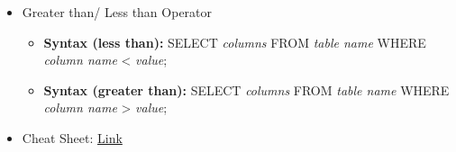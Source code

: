 \documentclass[12pt]{article}
\begin{document}
\begin{itemize}
    \item Greater than/ Less than Operator
    \begin{itemize}
        \item \textbf{Syntax (less than):} SELECT \textit{columns} FROM \textit{table name} WHERE \textit{column name} < \textit{value};
        \item \textbf{Syntax (greater than):} SELECT \textit{columns} FROM \textit{table name} WHERE \textit{column name} > \textit{value};
    \end{itemize}

    \item Cheat Sheet: \href{https://github.com/treehouse/cheatsheets/blob/master/sql_basics/cheatsheet.md}{Link}
\end{itemize}
\end{document}

